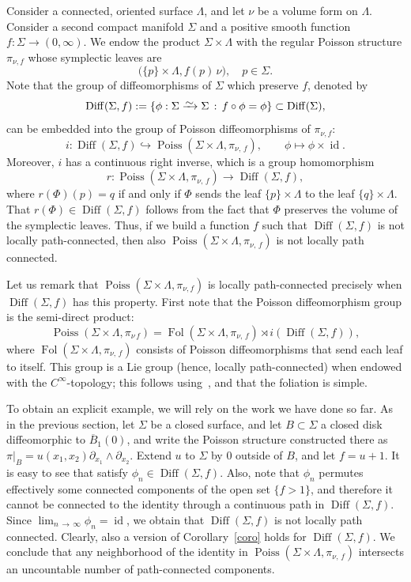 \documentclass[AHL,Unicode,published]{cedram}
\newcommand{\diffto}{\xrightarrow{\raisebox{-0.2 em}[0pt][0pt]{\smash{\ensuremath{\sim}}}}}
\DeclareMathOperator{\Poiss}{Poiss}
\DeclareMathOperator{\Diff}{Diff}
\DeclareMathOperator{\id}{id}
\DeclareMathOperator{\Fol}{Fol}
\begin{document}
Consider a connected, oriented surface $\Lambda$, and let $\nu$ be a volume form on $\Lambda$. Consider a second compact manifold $\Sigma$ and a positive smooth function $f:\Sigma\to (0,\infty)$. We endow the product $\Sigma\times
\Lambda$ with the regular Poisson structure $\pi_{\nu, f}$ whose symplectic leaves are
\[
\big(\{p\}\times \Lambda, f(p)\,\nu\big), \quad p\in \Sigma.
\]
Note that the group of diffeomorphisms of $\Sigma$ which preserve $f$, denoted by
\[
\Diff(\Sigma,f):=\left\{\phi:\Sigma\diffto \Sigma\, : \, f\circ \phi=\phi \right\}\subset \Diff(\Sigma),
\]
can be embedded into the group of Poisson diffeomorphisms of $\pi_{\nu, f}$:
\[
i:\Diff(\Sigma,f)\hookrightarrow\Poiss\left(\Sigma\times \Lambda,\pi_{\nu,\,f}\right), \qquad \phi\mapsto \phi\times\id.
\]
Moreover, $i$ has a continuous right inverse, which is a group homomorphism
\[
r:\Poiss\left(\Sigma\times \Lambda,\pi_{\nu,\,f}\right)\to \Diff\left(\Sigma,f\right),
\]
where $r(\Phi)(p)=q$ if and only if $\Phi$ sends the leaf $\{p\}\times
\Lambda$ to the leaf $\{q\}\times \Lambda$. That $r(\Phi)\in
\Diff(\Sigma,f)$ follows from the fact that $\Phi$ preserves the volume of the symplectic leaves. Thus, if we build a function $f$ such that $\Diff(\Sigma,f)$ is not locally path-connected, then also $\Poiss(\Sigma\times \Lambda,\pi_{\nu,\,f})$ is not locally path connected.

\begin{rema}
Let us remark that $\Poiss(\Sigma\times \Lambda,\pi_{\nu, f})$ is locally path-connected precisely when $\Diff(\Sigma,f)$ has this property. First note that the Poisson diffeomorphism group is the semi-direct product:
\[
\Poiss\left(\Sigma\times \Lambda,\pi_{\nu\,f}\right)=\Fol\left(\Sigma\times \Lambda,\pi_{\nu,\,f}\right)\rtimes i\left(\Diff\left(\Sigma,f\right)\right),
\]
where $\Fol(\Sigma\times \Lambda,\pi_{\nu,\,f})$ consists of Poisson diffeomorphisms that send each leaf to itself. This group is a Lie group (hence, locally path-connected) when endowed with the $C^{\infty}$-topology; this follows using~\cite{Rybicki}, and that the foliation is simple.
\end{rema}

To obtain an explicit example, we will rely on the work we have done so far. As in the previous section, let $\Sigma$ be a closed surface, and let $B\subset \Sigma$ a closed disk diffeomorphic to $\overline{B}_1(0)$, and write the Poisson structure constructed there as $\pi|_B=u(x_1,x_2)\partial_{x_1}\wedge\partial_{x_2}$. Extend $u$ to $\Sigma$ by $0$ outside of $B$, and let $f=u+1$. It is easy to see that satisfy $\phi_n\in \Diff(\Sigma,f)$. Also, note that $\phi_n$ permutes effectively some connected components of the open set $\{f>1\}$, and therefore it cannot be connected to the identity through a continuous path in $\Diff(\Sigma,f)$. Since $\lim_{n\,\to\,\infty}\phi_n=\id$, we obtain that $\Diff(\Sigma,f)$ is not locally path connected. Clearly, also a version of Corollary~\ref{coro} holds for $\Diff(\Sigma,f)$. We conclude that any neighborhood of the identity in $\Poiss(\Sigma\times \Lambda,\pi_{\nu,\,f})$ intersects an uncountable number of path-connected components.




\end{document}
